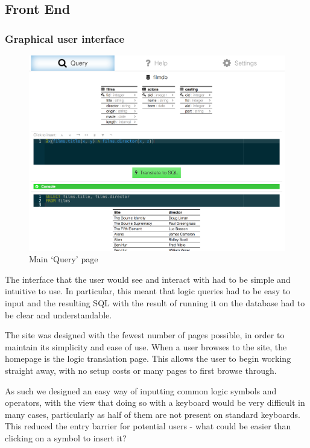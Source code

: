 \documentclass[a4paper, 11pt]{article}
\begin{document}
  \subsection{Front End}
    \subsubsection{Graphical user interface}
      \begin{figure}[h!]
        \includegraphics[width=\textwidth]{images/site_query.png}
        \caption{Main `Query' page}
      \end{figure}
      The interface that the user would see and interact with had to be simple
      and intuitive to use. In particular, this meant that logic queries had to
      be easy to input and the resulting SQL with the result of running it on
      the database had to be clear and understandable.

      The site was designed with the fewest number of pages possible, in order
      to maintain its simplicity and ease of use. When a user browses to the
      site, the homepage is the logic translation page. This allows the user to
      begin working straight away, with no setup costs or many pages to first
      browse through.

      As such we designed an easy way of inputting common logic symbols and
      operators, with the view that doing so with a keyboard would be very
      difficult in many cases, particularly as half of them are not present on
      standard keyboards. This reduced the entry barrier for potential users -
      what could be easier than clicking on a symbol to insert it?
\end{document}
